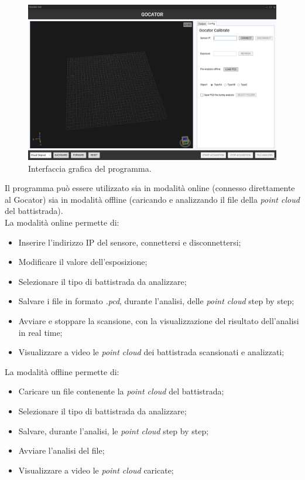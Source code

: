 \begin{figure}[H]
	\centering
	\includegraphics[width=0.9\columnwidth]{./pictures/gui_1.png}
	\caption{Interfaccia grafica del programma.}\label{fig:gui_1}
\end{figure}

\noindent Il programma può essere utilizzato sia in modalità online (connesso direttamente al Gocator) sia in modalità offline (caricando e analizzando il file della \textit{point cloud} del battistrada).\\
\newline
La modalità online permette di:

\begin{itemize}
	\item Inserire l'indirizzo IP del sensore, connettersi e disconnettersi;
	\item Modificare il valore dell'esposizione;
	\item Selezionare il tipo di battistrada da analizzare;
	\item Salvare i file in formato \textit{.pcd}, durante l'analisi, delle \textit{point cloud} step by step;
	\item Avviare e stoppare la scansione, con la visualizzazione del risultato dell'analisi in real time;
	\item Visualizzare a video le \textit{point cloud} dei battistrada scansionati e analizzati;
\end{itemize}

\noindent La modalità offline permette di:

\begin{itemize}
	\item Caricare un file contenente la \textit{point cloud} del battistrada;
	\item Selezionare il tipo di battistrada da analizzare;
	\item Salvare, durante l'analisi, le \textit{point cloud} step by step;
	\item Avviare l'analisi del file;
	\item Visualizzare a video le \textit{point cloud} caricate;
\end{itemize}

